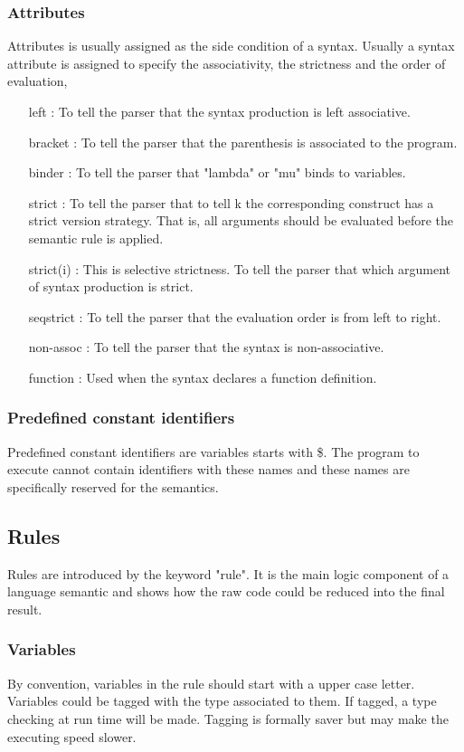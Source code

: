 \documentclass[a4paper]{article}
\begin{document}
\subsubsection{Attributes}
Attributes is usually assigned as the side condition of a syntax. Usually a syntax attribute is assigned to specify the associativity, the strictness and the order of evaluation, 
\begin{itemize}
    \item [left]: To tell the parser that the syntax production is left associative.
    \item [bracket]: To tell the parser that the parenthesis is associated to the program.
    \item [binder]: To tell the parser that "lambda" or "mu" binds to variables.
    \item [strict]: To tell the parser that to tell k the corresponding construct has a strict version strategy. That is, all arguments should be evaluated before the semantic rule is applied.
    \item [strict(i)]: This is selective strictness. To tell the parser that which argument of syntax production is strict.
    \item [seqstrict]: To tell the parser that the evaluation order is from left to right.
    \item [non-assoc]: To tell the parser that the syntax is non-associative.
    \item [function]: Used when the syntax declares a function definition.
\end{itemize}

\subsubsection{Predefined constant identifiers}
Predefined constant identifiers are variables starts with \$. The program to execute cannot contain identifiers with these names and these names are specifically reserved for the semantics.

\subsection{Rules}
Rules are introduced by the keyword "rule". It is the main logic component of a language semantic and shows how the raw code could be reduced into the final result.
\subsubsection{Variables}
By convention, variables in the rule should start with a upper case letter. Variables could be tagged with the type associated to them. If tagged, a type checking at run time will be made. Tagging is formally saver but may make the executing speed slower.
\end{document}

